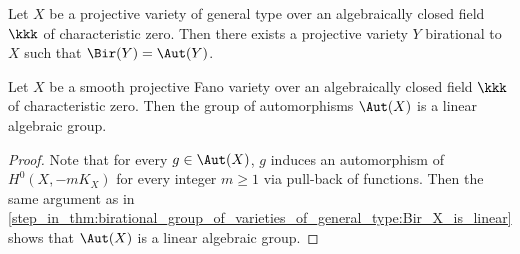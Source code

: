     \begin{corollary}\label{cor:regularization_of_birational_group_of_varieties_of_general_type}
        Let \(X\) be a projective variety of general type over an algebraically closed field \(\kkk\) of characteristic zero. 
        Then there exists a projective variety \(Y\) birational to \(X\) such that \(\Bir(Y) = \Aut(Y)\).
    \end{corollary}

    \begin{corollary}\label{cor:automorphism_group_of_Fano_varieties_is_linear}
        Let \(X\) be a smooth projective Fano variety over an algebraically closed field \(\kkk\) of characteristic zero. 
        Then the group of automorphisms \(\Aut(X)\) is a linear algebraic group.
    \end{corollary}
    \begin{proof}
        Note that for every \(g \in \Aut(X)\), \(g\) induces an automorphism of \(H^0(X, -mK_X)\) for every integer \(m \geq 1\) via pull-back of functions.
        Then the same argument as in \cref{step_in_thm:birational_group_of_varieties_of_general_type:Bir_X_is_linear} shows that \(\Aut(X)\) is a linear algebraic group.
    \end{proof}

    
    
    
